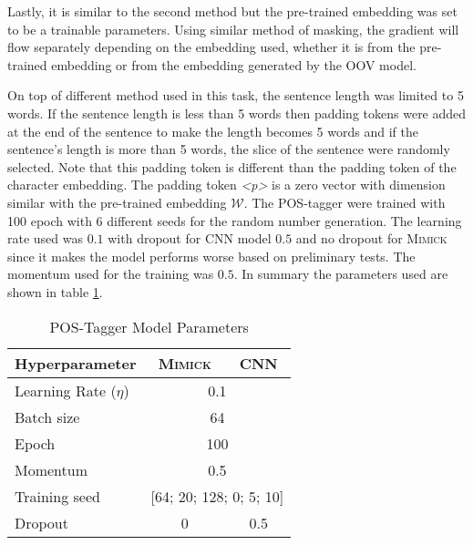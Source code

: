         Lastly, it is similar to the second method but the pre-trained
        embedding was set to be a trainable parameters. Using similar
        method of masking, the gradient will flow separately depending
        on the embedding used, whether it is from the pre-trained
        embedding or from the embedding generated by the OOV model.

        On top of different method used in this task, the sentence
        length was limited to 5 words. If the sentence length is less
        than 5 words then padding tokens were added at the end of the
        sentence to make the length becomes 5 words and if the
        sentence's length is more than 5 words, the slice of the
        sentence were randomly selected. Note that this padding token
        is different than the padding token of the character
        embedding. The padding token \textit{\textless p\textgreater}
        is a zero vector with dimension similar with the pre-trained
        embedding $\mathcal{W}$. The POS-tagger were trained with 100
        epoch with 6 different seeds for the random number generation.
        The learning rate used was $0.1$ with dropout for CNN model
        $0.5$ and no dropout for \textsc{Mimick} since it makes the
        model performs worse based on preliminary tests. The momentum
        used for the training was $0.5$. In summary the parameters
        used are shown in table \ref{tab:hyperparameterpostag}.

        \begin{table}[]
            \centering
            \caption{POS-Tagger Model Parameters}
            \label{tab:hyperparameterpostag}
            \begin{tabular}{@{}lcc@{}}
                \toprule
                \textbf{Hyperparameter} & \multicolumn{1}{c}{\textbf{\textsc{Mimick}}} & \multicolumn{1}{c}{\textbf{CNN}} \\ \midrule
                Learning Rate ($\eta$) & \multicolumn{2}{c}{0.1} \\
                Batch size & \multicolumn{2}{c}{64} \\
                Epoch & \multicolumn{2}{c}{100} \\
                Momentum & \multicolumn{2}{c}{0.5} \\
                Training seed & \multicolumn{2}{c}{[64; 20; 128; 0; 5;
                10]} \\
                Dropout & 0 & 0.5 \\ 
                \bottomrule
            \end{tabular}
        \end{table}

